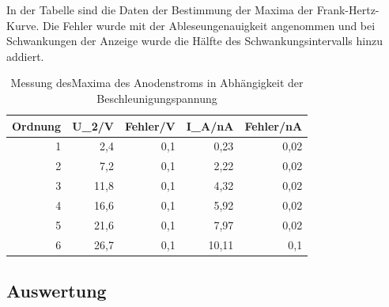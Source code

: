 \documentclass[12pt,a4paper]{article}
\begin{document}
In der Tabelle sind die Daten der Bestimmung der Maxima der Frank-Hertz-Kurve. Die Fehler wurde mit der Ableseungenauigkeit angenommen und bei Schwankungen der Anzeige wurde die Hälfte des Schwankungsintervalls hinzu addiert.

\begin{table}[htbp]
\caption{Messung desMaxima des  Anodenstroms in Abhängigkeit der Beschleunigungspannung}
\begin{center}
\begin{tabular}{|r|r|r|r|r|}
\hline
\multicolumn{1}{|l|}{Ordnung} & \multicolumn{1}{l|}{U\_2/V} & \multicolumn{1}{l|}{Fehler/V} & \multicolumn{1}{l|}{I\_A/nA} & \multicolumn{1}{l|}{Fehler/nA} \\ \hline
1 & 2,4 & 0,1 & 0,23 & 0,02 \\ \hline
2 & 7,2 & 0,1 & 2,22 & 0,02 \\ \hline
3 & 11,8 & 0,1 & 4,32 & 0,02 \\ \hline
4 & 16,6 & 0,1 & 5,92 & 0,02 \\ \hline
5 & 21,6 & 0,1 & 7,97 & 0,02 \\ \hline
6 & 26,7 & 0,1 & 10,11 & 0,1 \\ \hline
\end{tabular}
\end{center}
\label{tab:q__max_messung}
\end{table}



\subsection{Auswertung}
\end{document}
